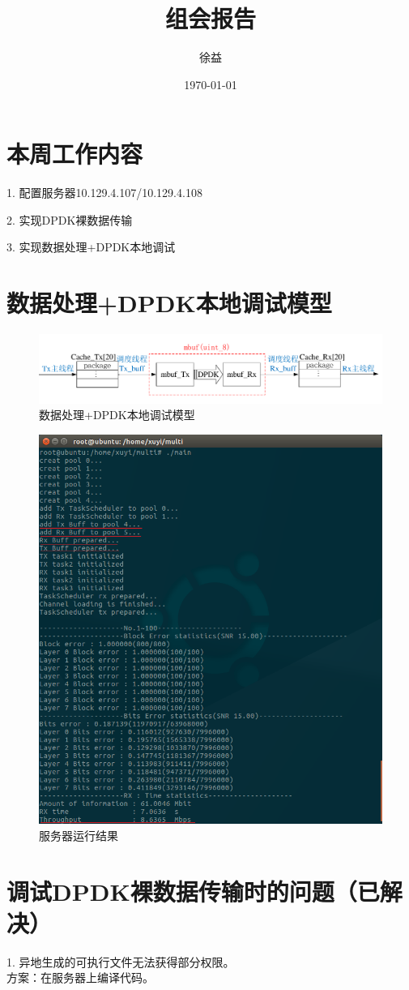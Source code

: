 \documentclass{article}
\title{组会报告}
\author{徐益}
\date{\today}
\begin{document}
	
\maketitle


\section{本周工作内容}

1. 配置服务器10.129.4.107/10.129.4.108

2. 实现DPDK裸数据传输

3. 实现数据处理+DPDK本地调试

\section{数据处理+DPDK本地调试模型}
\begin{figure}[H]
	\centering
	\includegraphics[width = \textwidth]{frame_mbuf.pdf}
	\caption{数据处理+DPDK本地调试模型}
\end{figure}
\begin{figure}[H]
	\centering
	\includegraphics[width = .45\textwidth]{multi_result.png}
	\caption{服务器运行结果}
\end{figure}

\section{调试DPDK裸数据传输时的问题（已解决）}
1. 异地生成的可执行文件无法获得部分权限。\\
方案：在服务器上编译代码。\\
\end{document}
